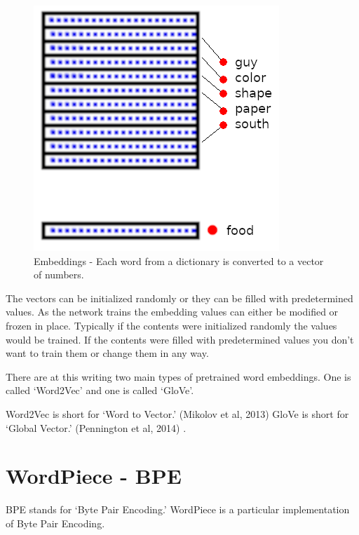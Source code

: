 \begin{figure}[H]
	\begin{center}
	\includegraphics[scale=0.5]{diagram-embedding}
	
	
\end{center}
	\caption[Word Embeddings]{Embeddings - Each word from a dictionary is converted to a vector of numbers.}
	
\end{figure}

The vectors can be initialized randomly or they can be filled with
predetermined values. As the network trains the embedding values can
either be modified or frozen in place. Typically if the contents were
initialized randomly the values would be trained. If the contents
were filled with predetermined values you don\textquoteright t want
to train them or change them in any way. 

There are at this writing two main types of pretrained word embeddings.
One is called \textquoteleft Word2Vec\textquoteright{} and one is
called \textquoteleft GloVe\textquoteright . 

Word2Vec is short for \textquoteleft Word to Vector.\textquoteright{}
(Mikolov et al, 2013)\cite{mikolov2013efficient} GloVe is short for \textquoteleft Global
Vector.\textquoteright{} (Pennington et al, 2014)\cite{pennington-etal-2014-glove} .


\section{WordPiece - BPE}

\ac{BPE} stands for `Byte Pair Encoding.' WordPiece is a particular implementation of Byte Pair Encoding.

